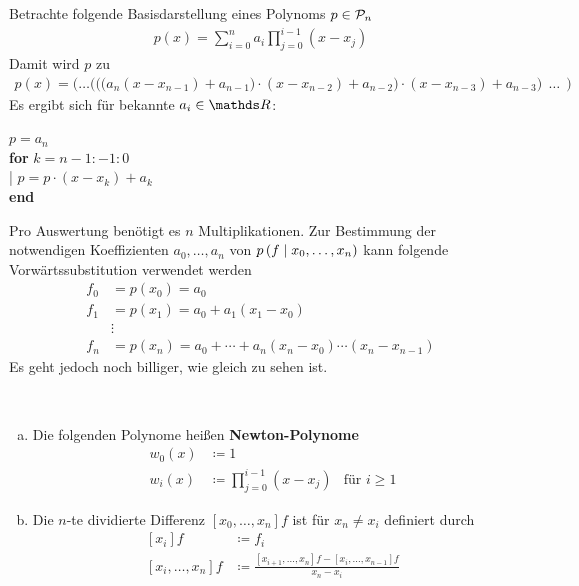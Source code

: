 Betrachte folgende Basisdarstellung eines Polynoms $p\in\mathcal{P}_n$
\begin{align}
  p(x) = \sum_{i=0}^{n}a_i \prod_{j=0}^{i-1} (x-x_j)
  \label{VI.1.9}
\end{align} 
Damit wird $p$ zu 
\begin{gather}
  p(x)= \Bigg(\dotsc \bigg(\Big(
  \big(a_n(x-x_{n-1})+a_{n-1}\big)\cdot(x-x_{n-2})+a_{n-2}\Big)
  \cdot (x-x_{n-3})+a_{n-3}\bigg)~~\dotsc~~\Bigg)
  \label{VI.1.10}
\end{gather}
Es ergibt sich für bekannte $a_i\in\R$:

\begin{pseudocode}{6cm}
  $p=a_n$ \\
  \textbf{for} $k=n-1:-1:0$\\
  |\>  $p=p\cdot (x-x_k)+a_k$\\
  \textbf{end}
\end{pseudocode}

Pro Auswertung benötigt es $n$ Multiplikationen.
Zur Bestimmung der notwendigen Koeffizienten $a_0,\dotsc, a_n$
von $p\left( f \mid x_0,\dotsc,x_n \right)$ kann folgende 
Vorwärtssubstitution verwendet werden
\begin{align*}
  f_0 &= p(x_0) = a_0\\
  f_1 &= p(x_1) = a_0+a_1(x_1-x_0)\\
      &\vdots\\
  f_n &=p(x_n) = a_0 + \dotsb + a_n(x_n-x_0)\dotsm(x_n-x_{n-1})
\end{align*}
Es geht jedoch noch billiger, wie gleich zu sehen ist.

\begin{Defe}~
  \begin{enumerate}[a)]
  \item Die folgenden Polynome heißen \textbf{Newton-Polynome}
    \begin{align*}
      w_0(x) &\coloneqq 1\\
      w_i(x) &\coloneqq \prod_{j=0}^{i-1} (x-x_j)
             &\text{für } i\geq 1
    \end{align*}
  \item Die $n$-te dividierte Differenz $[x_0,\dotsc, x_n]f$
    ist für $x_n\neq x_i$ definiert durch
    \begin{align}\nonumber
      [x_i]f &\coloneqq f_i\\
      [x_i,\dotsc,x_n]f 
             &\coloneqq
               \frac{[x_{i+1},\dotsc,x_n]f-[x_i,\dotsc,x_{n-1}]f}
               {x_n-x_i}
               \label{VI.1.11}
    \end{align}
  \end{enumerate}
\end{Defe}


